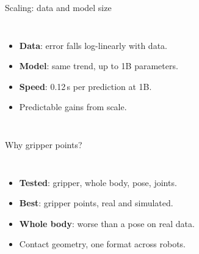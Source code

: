 \documentclass[aspectratio=169,12pt]{beamer}
\newcommand{\pw}[1]{{\color{pw}#1}}
\begin{document}
\begin{frame}[label=scaling]{Scaling: data and model size}
  \begin{columns}[c]
      \centering
      \footnotesize
      \begin{itemize}\setlength{\itemsep}{10pt}
        \item<1-> \textbf{Data}: error falls log-linearly with data.
        \item<2-> \textbf{Model}: same trend, up to 1B parameters.
        \item<3-> \textbf{Speed}: 0.12\,s per prediction at 1B.
        \item<4-> \pw{Predictable gains from scale.}
      \end{itemize}
  \end{columns}
\end{frame}

\begin{frame}[label=action]{Why gripper points?}
  \begin{columns}[c]
      \centering
      \footnotesize
      \begin{itemize}\setlength{\itemsep}{10pt}
        \item<1-> \textbf{Tested}: gripper, whole body, pose, joints.
        \item<2-> \textbf{Best}: gripper points, real and simulated.
        \item<3-> \textbf{Whole body}: worse than a pose on real data.
        \item<4-> \pw{Contact geometry, one format across robots.}
      \end{itemize}
  \end{columns}
\end{frame}
\end{document}
